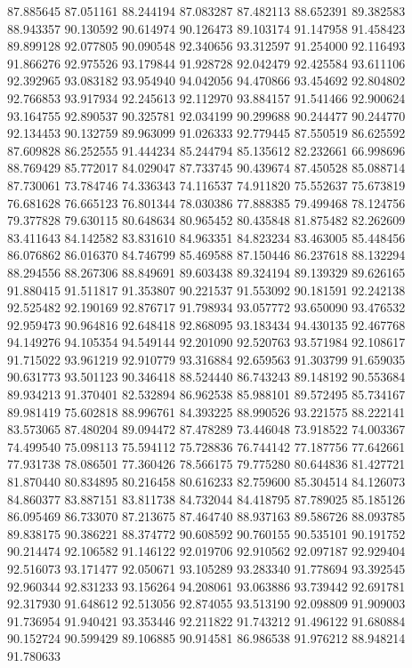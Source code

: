 87.885645
87.051161
88.244194
87.083287
87.482113
88.652391
89.382583
88.943357
90.130592
90.614974
90.126473
89.103174
91.147958
91.458423
89.899128
92.077805
90.090548
92.340656
93.312597
91.254000
92.116493
91.866276
92.975526
93.179844
91.928728
92.042479
92.425584
93.611106
92.392965
93.083182
93.954940
94.042056
94.470866
93.454692
92.804802
92.766853
93.917934
92.245613
92.112970
93.884157
91.541466
92.900624
93.164755
92.890537
90.325781
92.034199
90.299688
90.244477
90.244770
92.134453
90.132759
89.963099
91.026333
92.779445
87.550519
86.625592
87.609828
86.252555
91.444234
85.244794
85.135612
82.232661
66.998696
88.769429
85.772017
84.029047
87.733745
90.439674
87.450528
85.088714
87.730061
73.784746
74.336343
74.116537
74.911820
75.552637
75.673819
76.681628
76.665123
76.801344
78.030386
77.888385
79.499468
78.124756
79.377828
79.630115
80.648634
80.965452
80.435848
81.875482
82.262609
83.411643
84.142582
83.831610
84.963351
84.823234
83.463005
85.448456
86.076862
86.016370
84.746799
85.469588
87.150446
86.237618
88.132294
88.294556
88.267306
88.849691
89.603438
89.324194
89.139329
89.626165
91.880415
91.511817
91.353807
90.221537
91.553092
90.181591
92.242138
92.525482
92.190169
92.876717
91.798934
93.057772
93.650090
93.476532
92.959473
90.964816
92.648418
92.868095
93.183434
94.430135
92.467768
94.149276
94.105354
94.549144
92.201090
92.520763
93.571984
92.108617
91.715022
93.961219
92.910779
93.316884
92.659563
91.303799
91.659035
90.631773
93.501123
90.346418
88.524440
86.743243
89.148192
90.553684
89.934213
91.370401
82.532894
86.962538
85.988101
89.572495
85.734167
89.981419
75.602818
88.996761
84.393225
88.990526
93.221575
88.222141
83.573065
87.480204
89.094472
87.478289
73.446048
73.918522
74.003367
74.499540
75.098113
75.594112
75.728836
76.744142
77.187756
77.642661
77.931738
78.086501
77.360426
78.566175
79.775280
80.644836
81.427721
81.870440
80.834895
80.216458
80.616233
82.759600
85.304514
84.126073
84.860377
83.887151
83.811738
84.732044
84.418795
87.789025
85.185126
86.095469
86.733070
87.213675
87.464740
88.937163
89.586726
88.093785
89.838175
90.386221
88.374772
90.608592
90.760155
90.535101
90.191752
90.214474
92.106582
91.146122
92.019706
92.910562
92.097187
92.929404
92.516073
93.171477
92.050671
93.105289
93.283340
91.778694
93.392545
92.960344
92.831233
93.156264
94.208061
93.063886
93.739442
92.691781
92.317930
91.648612
92.513056
92.874055
93.513190
92.098809
91.909003
91.736954
91.940421
93.353446
92.211822
91.743212
91.496122
91.680884
90.152724
90.599429
89.106885
90.914581
86.986538
91.976212
88.948214
91.780633
